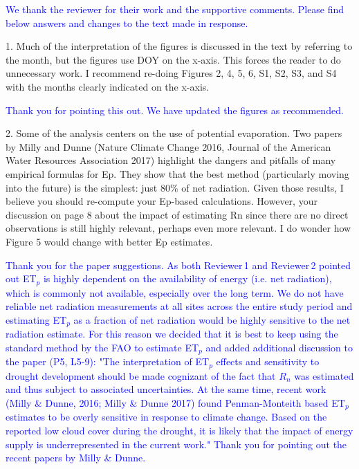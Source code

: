 \documentclass[hess, manuscript]{copernicus}
\def\TG{\textcolor{blue}}
\begin{document}
\TG{We thank the reviewer for their work and the supportive comments. Please find below answers and changes to the text made in response.}

1.  Much of the interpretation of the figures is discussed in the text by referring to the month, but the figures use DOY on the x-axis. This forces the reader to do unnecessary work. I recommend re-doing Figures 2, 4, 5, 6, S1, S2, S3, and S4 with the months
clearly indicated on the x-axis. 

\TG{Thank you for pointing this out. We have updated the figures as recommended.}

2.   Some  of  the  analysis  centers  on  the  use  of  potential  evaporation.   Two  papers by Milly and Dunne (Nature Climate Change 2016, Journal of the American Water Resources Association 2017) highlight the dangers and pitfalls of many empirical formulas for Ep. They show that the best method (particularly moving into the future) is the simplest:  just 80\% of net radiation.  Given those results, I believe you should re-compute your Ep-based calculations.  However, your discussion on page 8 about the impact of estimating Rn since there are no direct observations is still highly relevant, perhaps even more relevant. I do wonder how Figure 5 would change with better Ep estimates.

\TG{ Thank you for the paper suggestions. As both Reviewer\,1 and Reviewer\,2 pointed out ET$_p$ is highly dependent on the availability of energy (i.e. net radiation), which is commonly not available, especially over the long term. We do not have reliable net radiation measurements at all sites across the entire study period and estimating ET$_p$ as a fraction of net radiation would be highly sensitive to the net radiation estimate. For this reason we decided that it is best to keep using the standard method by the FAO to estimate ET$_p$ and added additional discussion to the paper (P5, L5-9): "The interpretation of ET$_p$ effects and sensitivity to drought development should be made cognizant of the fact that $R_n$ was estimated and thus subject to associated uncertainties. At the same time, recent work (Milly \& Dunne, 2016; Milly \& Dunne 2017) found Penman-Monteith based ET$_p$ estimates to be overly sensitive in response to climate change. Based on the reported low cloud cover during the drought, it is likely that the impact of energy supply is underrepresented in the current work." Thank you for pointing out the recent papers by Milly \& Dunne.}
\end{document}

